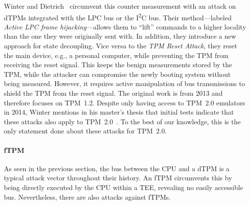 Winter and Dietrich~\cite{Winter2013} circumvent this counter measurement with an attack on \acp{dTPM} integrated with the LPC bus or the I\textsuperscript{2}C bus.
Their method---labeled \emph{Active LPC frame hijacking}---allows them to ``lift'' commands to a higher locality than the one they were originally sent with.
In addition, they introduce a new approach for state decoupling.
Vice versa to the \emph{TPM Reset Attack}, they reset the main device, e.g., a personal computer, while preventing the TPM from receiving the reset signal.
This keeps the benign measurements stored by the TPM, while the attacker can compromise the newly booting system without being measured.
However, it requires active manipulation of bus transmissions to shield the \ac{TPM} from the reset signal.
The original work is from 2013 and therefore focuses on TPM~1.2.
Despite only having access to TPM~2.0 emulators in 2014, Winter mentions in his master's thesis that initial tests indicate that these attacks also apply to TPM~2.0~\cite{winterMA2014}.
To the best of our knowledge, this is the only statement done about these attacks for TPM~2.0.



\paragraph{\Acl{fTPM}}

As seen in the previous section, the bus between the CPU and a \ac{dTPM} is a typical attack vector throughout their history.
An \ac{fTPM} circumvents this by being directly executed by the CPU within a \ac{TEE}, revealing no easily accessible bus.
Nevertheless, there are also attacks against \acp{fTPM}.

